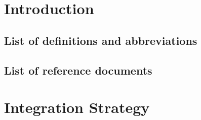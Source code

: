 \documentclass{../Common/Structure/doc_pdf}
\begin{document}
\titleToc
\newcommand{\testCase}[7]{%
	\unbreakableBlock{%
		\vspace{0.5em}
		\paragraphnewline{Test Case I#1}
		\newline
		\begin{tabulary}{\linewidth}{Y{3cm}|X{8.25cm}}
			\textbf{Test Item(s)} & #2 $\longleftrightarrow$ #3 \\ \hline
			\textbf{Input Specification} & #4 \\ \hline
			\textbf{Output Specification} & #5 \\ \hline
			\textbf{Environmental Needs} & #6 \\ \hline
			\textbf{Target} & #7 \\
		\end{tabulary}
		\vspace{0.5em}%
	}%
}

\newcommand{\testCaseSub}[7]{%
	\unbreakableBlock{%
		\vspace{0.5em}
		\paragraphnewline{Test Case S#1}
		\newline
		\begin{tabulary}{\linewidth}{Y{3cm}|X{8.25cm}}
			\textbf{Test Item(s)} & #2 $\longleftrightarrow$ #3 \\ \hline
			\textbf{Input Specification} & #4 \\ \hline
			\textbf{Output Specification} & #5 \\ \hline
			\textbf{Environmental Needs} & #6 \\ \hline
			\textbf{Target} & #7 \\
		\end{tabulary}
		\vspace{0.5em}%
	}%
}
\chapter{Introduction}

\section{List of definitions and abbreviations}

\section{List of reference documents}

\newpage

\chapter{Integration Strategy}
\end{document}

